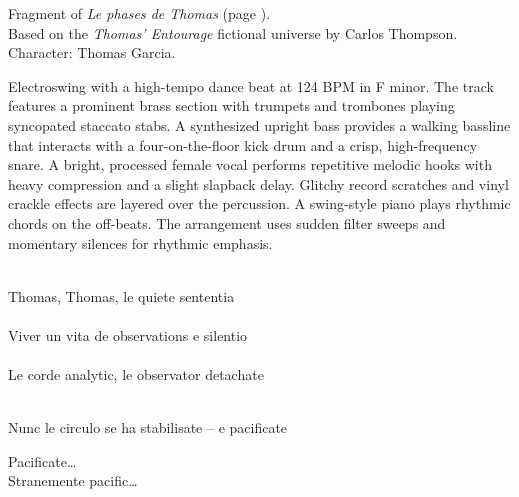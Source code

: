 

\begin{notes}
Fragment of \emph{Le phases de Thomas} (page \pageref{sec:le-phases-de-thomas}).\\
Based on the \emph{Thomas’ Entourage} fictional universe by Carlos Thompson.\\
Character: Thomas Garcia.\\
\end{notes}

\begin{style}
Electroswing with a high-tempo dance beat at 124 BPM in F minor. %
The track features a prominent brass section with trumpets and trombones playing syncopated staccato stabs. %
A synthesized upright bass provides a walking bassline that interacts with a four-on-the-floor kick drum and a crisp, high-frequency snare. %
A bright, processed female vocal performs repetitive melodic hooks with heavy compression and a slight slapback delay. %
Glitchy record scratches and vinyl crackle effects are layered over the percussion. %
A swing-style piano plays rhythmic chords on the off-beats. %
The arrangement uses sudden filter sweeps and momentary silences for rhythmic emphasis.
\end{style}

\begin{lyrics}
\\
 Thomas, Thomas, le quiete sententia\\
\\
Viver un vita de observations e silentio\\
\\
Le corde analytic, le observator detachate

\\
Nunc le circulo se ha stabilisate – e pacificate

Pacificate…\\
 Stranemente pacific…
\end{lyrics}

